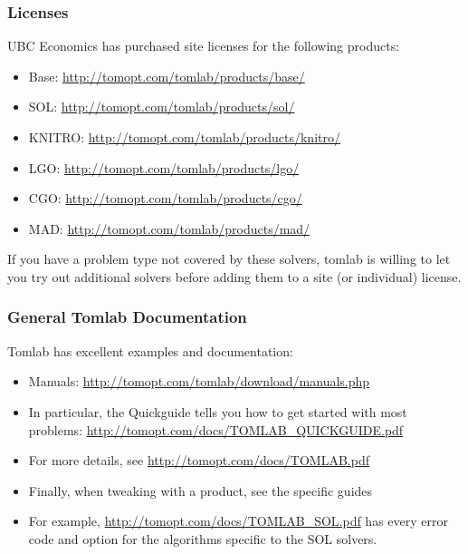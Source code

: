 \documentclass[nofootline]{etk-presentation}
\begin{document}
\begin{frame}\frametitle{}
	\bigskip
	\bigskip
	\bigskip	
	\begin{center}
		{\huge {}}
	\end{center}
\end{frame}

\begin{frame}[fragile]	\frametitle{Licenses}
UBC Economics has purchased site licenses for the following products:
\begin{itemize}
	\item Base: \url{http://tomopt.com/tomlab/products/base/}
	\item SOL: \url{http://tomopt.com/tomlab/products/sol/}
	\item KNITRO: \url{http://tomopt.com/tomlab/products/knitro/}
	\item LGO: \url{http://tomopt.com/tomlab/products/lgo/}
	\item CGO: \url{http://tomopt.com/tomlab/products/cgo/}
	\item MAD: \url{http://tomopt.com/tomlab/products/mad/}
\end{itemize}
If you have a problem type not covered by these solvers, tomlab is willing to let you try out additional solvers before adding them to a site (or individual) license.
\end{frame}	

\begin{frame}[fragile]	\frametitle{General Tomlab Documentation}
Tomlab has excellent examples and documentation:
	\begin{itemize}
		\item Manuals: \url{http://tomopt.com/tomlab/download/manuals.php}
		\item In particular, the Quickguide tells you how to get started with most problems:  \url{http://tomopt.com/docs/TOMLAB_QUICKGUIDE.pdf}
		\item For more details, see \url{http://tomopt.com/docs/TOMLAB.pdf}
		\item Finally, when tweaking with a product, see the specific guides
		\item  For example, \url{http://tomopt.com/docs/TOMLAB_SOL.pdf} has every error code and option for the algorithms specific to the SOL solvers.
	\end{itemize}	
\end{frame}	
\end{document}
